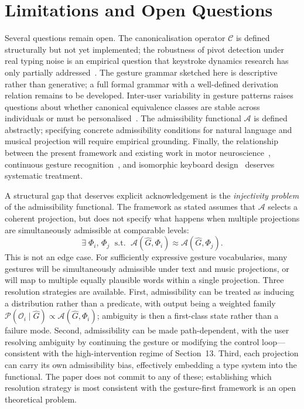 \documentclass[11pt, a4paper]{article}
\begin{document}
\section{Limitations and Open Questions}

Several questions remain open. The canonicalisation operator $\mathcal{C}$
is defined structurally but not yet implemented; the robustness of pivot
detection under real typing noise is an empirical question that keystroke
dynamics research has only partially
addressed~\cite{killourhy2009,gunetti2005}. The gesture grammar sketched
here is descriptive rather than generative; a full formal grammar with a
well-defined derivation relation remains to be developed. Inter-user
variability in gesture patterns raises questions about whether canonical
equivalence classes are stable across individuals or must be
personalised~\cite{monrose2000}. The admissibility functional
$\mathcal{A}$ is defined abstractly; specifying concrete admissibility
conditions for natural language and musical projection will require
empirical grounding. Finally, the relationship between the present
framework and existing work in motor neuroscience~\cite{schieber2001},
continuous gesture recognition~\cite{wobbrock2007}, and isomorphic
keyboard design~\cite{lumatone} deserves systematic treatment.

A structural gap that deserves explicit acknowledgement is the
\emph{injectivity problem} of the admissibility functional. The framework
as stated assumes that $\mathcal{A}$ selects a coherent projection, but
does not specify what happens when multiple projections are simultaneously
admissible at comparable levels:
\[
  \exists\; \Phi_i,\, \Phi_j \;\text{ s.t. }\;
  \mathcal{A}(\hat{G}, \Phi_i) \approx \mathcal{A}(\hat{G}, \Phi_j).
\]
This is not an edge case. For sufficiently expressive gesture vocabularies,
many gestures will be simultaneously admissible under text and music
projections, or will map to multiple equally plausible words within a
single projection. Three resolution strategies are available. First,
admissibility can be treated as inducing a distribution rather than a
predicate, with output being a weighted family
$\mathcal{P}(\mathcal{O}_i \mid \hat{G}) \propto \mathcal{A}(\hat{G},
\Phi_i)$; ambiguity is then a first-class state rather than a failure
mode. Second, admissibility can be made path-dependent, with the user
resolving ambiguity by continuing the gesture or modifying the control
loop---consistent with the high-intervention regime of Section~13.
Third, each projection can carry its own admissibility bias, effectively
embedding a type system into the functional. The paper does not commit to
any of these; establishing which resolution strategy is most consistent
with the gesture-first framework is an open theoretical problem.
\end{document}
